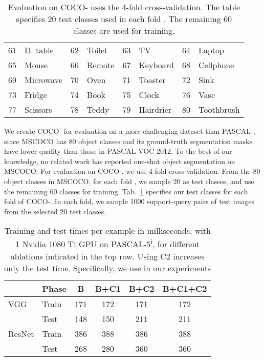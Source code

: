 \documentclass[10pt,twocolumn,letterpaper]{article}
\begin{document}
\begin{table}[b]
\begin{footnotesize}
\begin{tabular}{rl|rl|rl|rl}
61      & D. table      & 62     & Toilet            & 63     & TV                & 64     & Laptop            \\
65      & Mouse             & 66     & Remote            & 67     & Keyboard          & 68     & Cellphone        \\
69      & Microwave         & 70     & Oven              & 71     & Toaster           & 72     & Sink              \\
73      & Fridge      & 74     & Book              & 75     & Clock             & 76     & Vase              \\
77      & Scissors          & 78     & Teddy        & 79     & Hairdrier        & 80     & Toothbrush     \\
\hline
\hline
\end{tabular}
\end{footnotesize}
\caption{Evaluation on COCO- uses the 4-fold cross-validation. The table specifies 20
  test classes used in each fold . The remaining 60 classes are used for training.}
\label{tab:coco}
\end{table}

We create COCO- for evaluation on a more challenging dataset than PASCAL-, since  MSCOCO has 80 object classes and its ground-truth segmentation masks have lower quality than those in PASCAL VOC 2012. To the best of our knowledge, no related work has reported one-shot object segmentation on MSCOCO. For evaluation on COCO-, we use 4-fold cross-validation. From the 80 object classes in MSCOCO, for each fold , we sample 20 as test classes, and use the remaining 60 classes for training.  Tab.~\ref{tab:coco} specifies our test classes for each fold of COCO-. In each fold, we sample 1000 support-query pairs of test images from the selected 20 test classes. 

\begin{table}[t]
  \centering
  \begin{tabular}{llcccc}
    \hline
    \hline
   & \textbf{Phase} & \textbf{B} & \textbf{B+C1} & \textbf{B+C2} & \textbf{B+C1+C2}\\
    \hline
    VGG & Train & 171 & 172 & 171 & 172 \\
    & Test & 148  & 150 & 211 & 211 \\
    \hline
    ResNet & Train & 386 & 388 & 386 & 388 \\
    & Test & 268  & 280 & 360  & 360 \\
    \hline
    \hline
  \end{tabular}
  \caption{Training and test times per example in milliseconds, with 1 Nvidia 1080 Ti GPU on PASCAL-5\textsuperscript{i}, for different ablations indicated in the top row. Using C2 increases only the test time. Specifically, we use  in our experiments}
  \label{tab:time}
  \vspace{-10pt}
\end{table}
\end{document}

